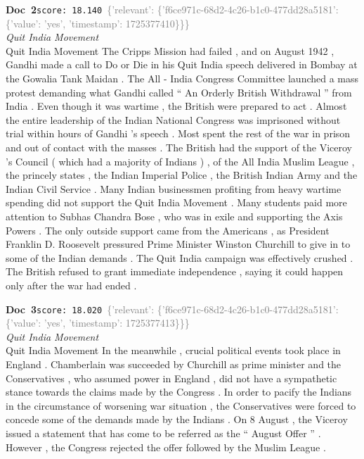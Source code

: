 \documentclass[a4paper,11pt]{article}
\begin{document}
\begin{docenv}
{\footnotesize\textcolor{doccolor}{\textbf{Doc~2}}}\hfill{\tiny\texttt{score:~18.140}}\ {\tiny\textcolor{gray}{\{'relevant': \{'f6ce971c-68d2-4c26-b1c0-477dd28a5181': \{'value': 'yes', 'timestamp': 1725377410\}\}\}}}\\[3pt]
{\small\textit{Quit India Movement}}\\[2pt]
\vspace{2pt}
{\footnotesize Quit India Movement
The Cripps Mission had failed , and on August 1942 , Gandhi made a call to Do or Die in his Quit India speech delivered in Bombay at the Gowalia Tank Maidan . The All - India Congress Committee launched a mass protest demanding what Gandhi called `` An Orderly British Withdrawal '' from India . Even though it was wartime , the British were prepared to act . Almost the entire leadership of the Indian National Congress was imprisoned without trial within hours of Gandhi 's speech . Most spent the rest of the war in prison and out of contact with the masses . The British had the support of the Viceroy 's Council ( which had a majority of Indians ) , of the All India Muslim League , the princely states , the Indian Imperial Police , the British Indian Army and the Indian Civil Service . Many Indian businessmen profiting from heavy wartime spending did not support the Quit India Movement . Many students paid more attention to Subhas Chandra Bose , who was in exile and supporting the Axis Powers . The only outside support came from the Americans , as President Franklin D. Roosevelt pressured Prime Minister Winston Churchill to give in to some of the Indian demands . The Quit India campaign was effectively crushed . The British refused to grant immediate independence , saying it could happen only after the war had ended .}
\end{docenv}
\begin{docenv}
{\footnotesize\textcolor{doccolor}{\textbf{Doc~3}}}\hfill{\tiny\texttt{score:~18.020}}\ {\tiny\textcolor{gray}{\{'relevant': \{'f6ce971c-68d2-4c26-b1c0-477dd28a5181': \{'value': 'yes', 'timestamp': 1725377413\}\}\}}}\\[3pt]
{\small\textit{Quit India Movement}}\\[2pt]
\vspace{2pt}
{\footnotesize Quit India Movement
In the meanwhile , crucial political events took place in England . Chamberlain was succeeded by Churchill as prime minister and the Conservatives , who assumed power in England , did not have a sympathetic stance towards the claims made by the Congress . In order to pacify the Indians in the circumstance of worsening war situation , the Conservatives were forced to concede some of the demands made by the Indians . On 8 August , the Viceroy issued a statement that has come to be referred as the `` August Offer '' . However , the Congress rejected the offer followed by the Muslim League .}
\end{docenv}
\end{document}
